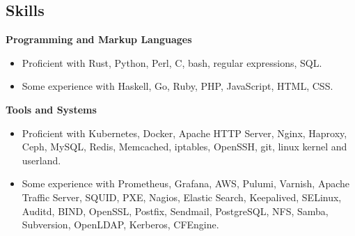 \documentclass[line]{res}
\begin{document}
\begin{resume}
\section{Skills}

\textbf{Programming and Markup Languages}
\begin{itemize}
\item Proficient with Rust, Python, Perl, C, bash, regular expressions, SQL.
\item Some experience with Haskell, Go, Ruby, PHP, JavaScript, HTML, CSS.
\end{itemize}

\textbf{Tools and Systems}
\begin{itemize}
\item Proficient with Kubernetes, Docker, Apache HTTP Server, Nginx, Haproxy, Ceph, MySQL, Redis, Memcached, iptables, OpenSSH, git, linux kernel and userland.
\item Some experience with Prometheus, Grafana, AWS, Pulumi, Varnish, Apache Traffic Server, SQUID, PXE, Nagios, Elastic Search, Keepalived, SELinux, Auditd, BIND, OpenSSL, Postfix, Sendmail, PostgreSQL, NFS, Samba, Subversion, OpenLDAP, Kerberos, CFEngine.
\end{itemize}

\end{resume}
\end{document}
